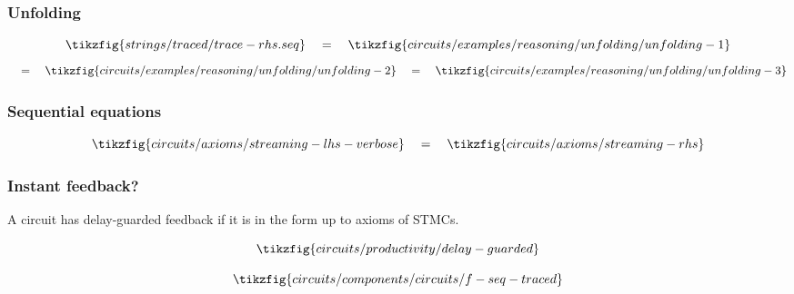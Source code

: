 \begin{frame}
    \frametitle{Unfolding}

    \[
        \tikzfig{strings/traced/trace-rhs.seq} 
        \quad=\quad
        \tikzfig{circuits/examples/reasoning/unfolding/unfolding-1}
    \]
    \[
        \quad=\quad
        \tikzfig{circuits/examples/reasoning/unfolding/unfolding-2}
        \quad=\quad
        \tikzfig{circuits/examples/reasoning/unfolding/unfolding-3}
    \]

\end{frame}

\begin{frame}
    \frametitle{Sequential equations}

    \[
        \tikzfig{circuits/axioms/streaming-lhs-verbose}
        \quad=\quad
        \tikzfig{circuits/axioms/streaming-rhs}    
    \]
\end{frame}

\begin{frame}
    \frametitle{Instant feedback?}

    A circuit has \alert{delay-guarded feedback} if it is in the form \alert{up to axioms of STMCs}. 

    \[
        \tikzfig{circuits/productivity/delay-guarded}  
    \]

    \[
        \tikzfig{circuits/components/circuits/f-seq-traced}    
    \]
    


\end{frame}